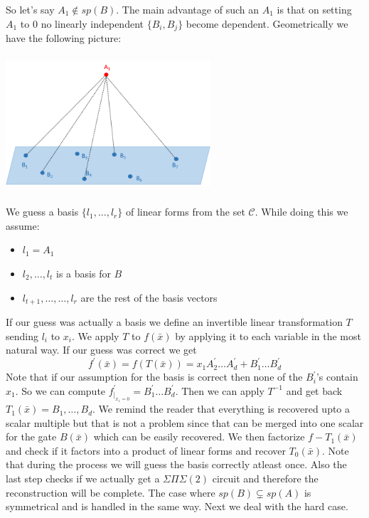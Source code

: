 \documentclass[letterpaper,USenglish,numberwithinsect]{lipics}
\newcommand{\MC}{\mathcal{C}}
\newcommand{\B}[1]{\bar{#1}}
\begin{document}
So let's say $A_1\notin sp(B)$. The main advantage of such an $A_1$ is that on setting $A_1$ to $0$ no linearly independent $\{B_i,B_j\}$ become dependent. Geometrically we have the following picture:

\includegraphics[width=3in, height=2in]{easycase.png}



We guess a basis $\{l_1,\ldots,l_r\}$ of linear forms from the set $\MC$.
While doing this we assume:
\begin{itemize}
 \item $l_1=A_1$
 \item $l_2,\ldots,l_t$ is a basis for $B$
 \item $l_{t+1},\ldots,\ldots,l_r$ are the rest of the basis vectors
\end{itemize}
If our guess was actually a basis we define an invertible linear transformation $T$ sending $l_i$ to $x_i$. We apply $T$ to $f(\B{x})$
by applying it to each variable in the most natural way. If our guess was correct we get
\[
f^\prime(\B{x}) = f(T(\B{x})) = x_1A_2^\prime\ldots A_d^\prime + B_1^\prime\ldots B_d^\prime 													
\]
Note that if our assumption for the basis is correct then none of the $B_i^\prime$'s contain $x_1$. So we can compute
$f^\prime_{|_{x_1=0}} = B_1^\prime\ldots B_d^\prime$. Then we can apply $T^{-1}$ and get back $T_1(\B{x})=B_1,\ldots,B_d$. We remind the
reader that everything is recovered upto a scalar multiple but that is not a problem since that can be merged into one scalar for the gate
$B(\B{x})$ which can be easily recovered.  We then factorize $f-T_1(\B{x})$ and check if it factors into a product of linear forms and recover
$T_0(\B{x})$. Note that during the process we will guess the basis correctly atleast once. Also the last step checks if we actually
get a $\Sigma\Pi\Sigma(2)$ circuit and therefore the reconstruction will be complete. The case where $sp(B)\subsetneq sp(A)$ is symmetrical
and is handled in the same way. Next we deal with the hard case.
\end{document}
